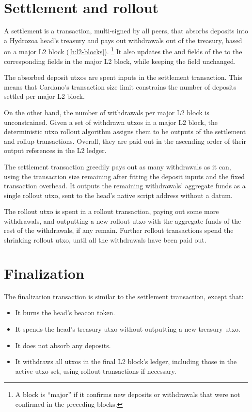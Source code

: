 \documentclass[../hydrozoa.tex]{subfiles}
\begin{document}
\section{Settlement and rollout}%
\label{h:l1-multisig-settlement-rollout}%

A settlement is a transaction, multi-signed by all peers, that absorbs deposits into a Hydrozoa head's treasury and pays out withdrawals out of the treasury, based on a major L2 block (\cref{h:l2-blocks}).%
\footnote{A block is ``major'' if it confirms new deposits or withdrawals that were not confirmed in the preceding blocks.}
It also updates the  and  fields of the  to the corresponding fields in the major L2 block, while keeping the  field unchanged.

The absorbed deposit utxos are spent inputs in the settlement transaction.
This means that Cardano's transaction size limit constrains the number of deposits settled per major L2 block.

On the other hand, the number of withdrawals per major L2 block is unconstrained.
Given a set of withdrawn utxos in a major L2 block, the deterministic utxo rollout algorithm assigns them to be outputs of the settlement and rollup transactions.
Overall, they are paid out in the ascending order of their output references in the L2 ledger.


The settlement transaction greedily pays out as many withdrawals as it can, using the transaction size remaining after fitting the deposit inputs and the fixed transaction overhead.
It outputs the remaining withdrawals' aggregate funds as a single rollout utxo, sent to the head's native script address without a datum.

The rollout utxo is spent in a rollout transaction, paying out some more withdrawals, and outputting a new rollout utxo with the aggregate funds of the rest of the withdrawals, if any remain.
Further rollout transactions spend the shrinking rollout utxo, until all the withdrawals have been paid out.

\section{Finalization}%
\label{h:l1-multisig-finalization}%

The finalization transaction is similar to the settlement transaction, except that:
\begin{itemize}
  \item It burns the head's beacon token.
  \item It spends the head's treasury utxo without outputting a new treasury utxo.
  \item It does not absorb any deposits.
  \item It withdraws all utxos in the final L2 block's ledger, including those in the active utxo set, using rollout transactions if necessary.
\end{itemize}
\end{document}
